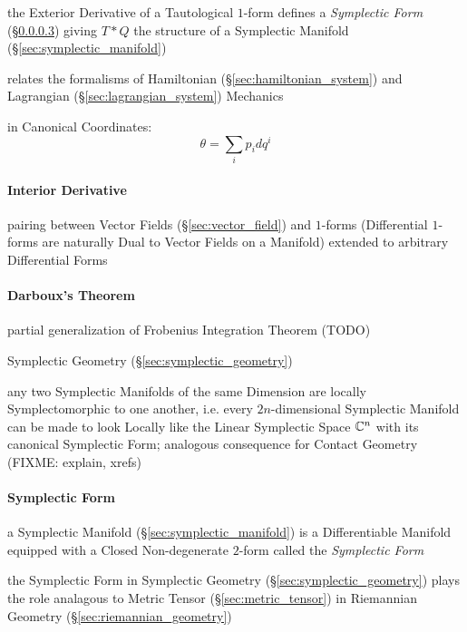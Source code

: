 the Exterior Derivative of a Tautological $1$-form defines a \emph{Symplectic
  Form} (\S\ref{sec:symplectic_form}) giving $T * Q$ the structure of a
Symplectic Manifold (\S\ref{sec:symplectic_manifold})

relates the formalisms of Hamiltonian (\S\ref{sec:hamiltonian_system}) and
Lagrangian (\S\ref{sec:lagrangian_system}) Mechanics

in Canonical Coordinates:
\[
  \theta = \sum_i p_i dq^i
\]



\paragraph{Interior Derivative}\label{sec:interior_derivative}\hfill

pairing between Vector Fields (\S\ref{sec:vector_field}) and $1$-forms
(Differential $1$-forms are naturally Dual to Vector Fields on a Manifold)
extended to arbitrary Differential Forms



\paragraph{Darboux's Theorem}\label{sec:darbouxs_theorem}\hfill

partial generalization of Frobenius Integration Theorem (TODO)

Symplectic Geometry (\S\ref{sec:symplectic_geometry})

any two Symplectic Manifolds of the same Dimension are locally Symplectomorphic
to one another, i.e. every $2n$-dimensional Symplectic Manifold can be made to
look Locally like the Linear Symplectic Space $\mathbb{C}^n$ with its canonical
Symplectic Form; analogous consequence for Contact Geometry (FIXME: explain,
xrefs)



\paragraph{Symplectic Form}\label{sec:symplectic_form}\hfill


a Symplectic Manifold (\S\ref{sec:symplectic_manifold}) is a Differentiable
Manifold equipped with a Closed Non-degenerate $2$-form called the
\emph{Symplectic Form}

the Symplectic Form in Symplectic Geometry (\S\ref{sec:symplectic_geometry})
plays the role analagous to Metric Tensor (\S\ref{sec:metric_tensor}) in
Riemannian Geometry (\S\ref{sec:riemannian_geometry})

